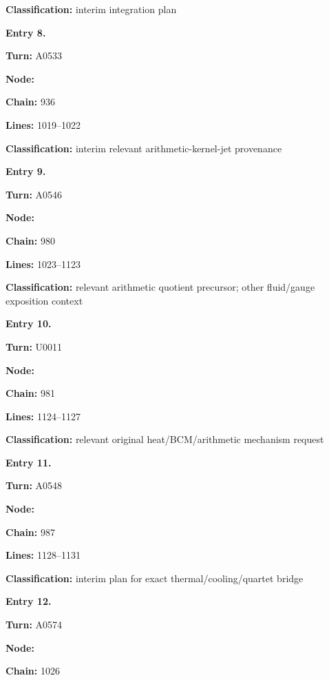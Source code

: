 \textbf{Classification:} interim integration plan


\textbf{Entry 8.}

\textbf{Turn:} A0533

\textbf{Node:} \protect{}

\textbf{Chain:} 936

\textbf{Lines:} 1019--1022

\textbf{Classification:} interim relevant arithmetic-kernel-jet
provenance


\textbf{Entry 9.}

\textbf{Turn:} A0546

\textbf{Node:} \protect{}

\textbf{Chain:} 980

\textbf{Lines:} 1023--1123

\textbf{Classification:} relevant arithmetic quotient precursor; other
fluid/gauge exposition context


\textbf{Entry 10.}

\textbf{Turn:} U0011

\textbf{Node:} \protect{}

\textbf{Chain:} 981

\textbf{Lines:} 1124--1127

\textbf{Classification:} relevant original heat/BCM/arithmetic mechanism
request


\textbf{Entry 11.}

\textbf{Turn:} A0548

\textbf{Node:} \protect{}

\textbf{Chain:} 987

\textbf{Lines:} 1128--1131

\textbf{Classification:} interim plan for exact thermal/cooling/quartet
bridge


\textbf{Entry 12.}

\textbf{Turn:} A0574

\textbf{Node:} \protect{}

\textbf{Chain:} 1026

